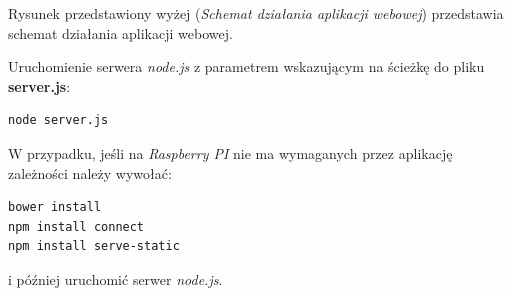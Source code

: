 Rysunek przedstawiony wyżej (\textit{Schemat działania aplikacji webowej}) przedstawia schemat działania aplikacji webowej.

Uruchomienie serwera \textit{node.js} z parametrem wskazującym na ścieżkę do pliku \textbf{server.js}:
\begin{lstlisting}
node server.js
\end{lstlisting}

W przypadku, jeśli na \textit{Raspberry PI} nie ma wymaganych przez aplikację zależności należy wywołać:
\begin{lstlisting}
bower install
npm install connect
npm install serve-static
\end{lstlisting}
i później uruchomić serwer \textit{node.js}.
%

